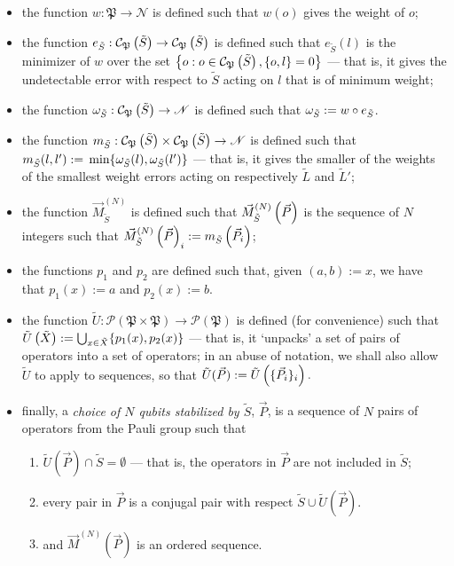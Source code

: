 \documentclass[twocolumn,showpacs,preprintnumbers,amsmath,amssymb,nofootinbib,pra,floatfix]{revtex4-1}
\newenvironment{definition}[1][Definition]{\begin{trivlist}
\item[\hskip \labelsep {\bfseries #1}]}{\end{trivlist}}
\newcommand{\lst}{\vec}
\newcommand{\set}{\tilde}
\newcommand{\pauligroup}{\mathfrak{P}}
\newcommand{\powerset}{\mathcal{P}}
\newcommand{\centralizer}{\mathcal{C}}
\begin{document}
\begin{definition}

\begin{itemize}
\item the function $w:\pauligroup\to \mathscr{N}$ is defined such that $w(o)$ gives the weight of $o$;
\item the function $e_{\set S}:\centralizer_\pauligroup\paren{\set S}\to \centralizer_\pauligroup\paren{\set S}$ is defined such that $e_{\set S}(l)$ is the minimizer of $w$ over the set $\left\{o: o\in \centralizer_\pauligroup\paren{\set S}, \{o,l\}=0\right\}$ --- that is, it gives the undetectable error with respect to $\set S$ acting on $l$ that is of minimum weight;
\item the function $\om_{\set S}:\centralizer_\pauligroup\paren{\set S}\to\mathscr{N}$ is defined such that $\om_{\set S}:=w\circ e_{\set S}$.
\item the function $m_{\set S}:\centralizer_\pauligroup\paren{\set S}\times \centralizer_\pauligroup\paren{\set S} \to \mathscr{N}$ is defined such that $m_{\set S}(l,l'):=\min \{\om_{\set S}(l),\om_{\set S}(l')\}$ --- that is, it gives the smaller of the weights of the smallest weight errors acting on respectively $\set L$ and $\set L'$;
\item the function $\vec M^{(N)}_{\set S}$ is defined such that $\vec M^{(N)}_{\set S}\paren{\vec P}$ is the sequence of $N$ integers such that $\vec M^{(N)}_{\set S}\paren{\vec P}_i := m_{\set S}\paren{\vec P_i}$;
\item the functions $p_1$ and $p_2$ are defined such that, given $(a,b):=x$, we have that $p_1(x):=a$ and $p_2(x):=b$.
\item the function $\set U:\powerset(\pauligroup\times\pauligroup)\to\powerset(\pauligroup)$ is defined (for convenience) such that $\set U\paren{\set X}:=\bigcup_{x\in\set X} \{p_1(x),p_2(x)\}$ --- that is, it `unpacks' a set of pairs of operators into a set of operators;  in an abuse of notation, we shall also allow $\set U$ to apply to sequences, so that $\set U(\lst P) := \set U\paren{\{\lst P_i\}_i}.$
\item finally, a \emph{choice of $N$ qubits stabilized by $\set S$}, $\lst P$, is a sequence of $N$ pairs of operators from the Pauli group such that 
\begin{enumerate}
\item $\set U(\lst P)\cap \set S = \emptyset$ --- that is, the operators in $\lst P$ are not included in $\set S$;
\item every pair in $\lst P$ is a conjugal pair with respect $\set S \cup \set U(\lst P)$.
\item and $\lst M^{(N)}(\lst P)$ is an ordered sequence.
\end{enumerate}
\end{itemize}

\end{definition}
\end{document}
